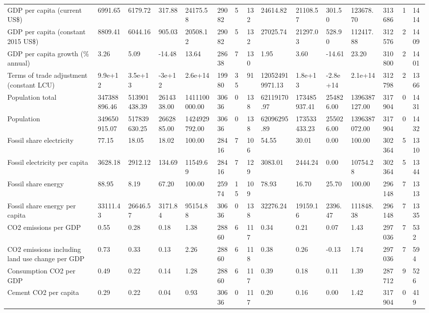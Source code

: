 \begin{longtable}{lllllllllllllll}
GDP per capita (current US\$) & 6991.65 & 6179.72 & 317.88 & 24175.58 & 29082 & 5 & 132 & 24614.82 & 21108.57 & 301.50 & 123678.70 & 313686 & 1 & 1414\\
GDP per capita (constant 2015 US\$) & 8809.41 & 6044.16 & 905.03 & 20508.12 & 29082 & 5 & 132 & 27025.74 & 21297.03 & 528.90 & 112417.88 & 312576 & 2 & 1409\\
GDP per capita growth (\% annual) & 3.26 & 5.09 & -14.48 & 13.64 & 28638 & 7 & 130 & 1.95 & 3.60 & -14.61 & 23.20 & 310800 & 2 & 1401\\
\addlinespace
Terms of trade adjustment (constant LCU) & 9.9e+12 & 3.5e+13 & -3e+12 & 2.6e+14 & 19980 & 35 & 91 & 120524919971.13 & 1.8e+13 & -2.8e+14 & 2.1e+14 & 312798 & 2 & 1366\\
Population total & 347388896.46 & 513901438.39 & 2614338.00 & 1411100000.00 & 30636 & 0 & 138 & 62119170.97 & 173485937.41 & 254826.00 & 1396387127.00 & 317904 & 0 & 1431\\
Population & 349650915.07 & 517839630.25 & 2662885.00 & 1424929792.00 & 30636 & 0 & 138 & 62096295.89 & 173533433.23 & 255026.00 & 1396387072.00 & 317904 & 0 & 1432\\
Fossil share electricity & 77.15 & 18.05 & 18.02 & 100.00 & 28416 & 7 & 106 & 54.55 & 30.01 & 0.00 & 100.00 & 302364 & 5 & 1310\\
Fossil electricity per capita & 3628.18 & 2912.12 & 134.69 & 11549.69 & 28416 & 7 & 129 & 3083.01 & 2444.24 & 0.00 & 10754.28 & 302364 & 5 & 1344\\
\addlinespace
Fossil share energy & 88.95 & 8.19 & 67.20 & 100.00 & 25974 & 15 & 109 & 78.93 & 16.70 & 25.70 & 100.00 & 296148 & 7 & 1313\\
Fossil share energy per capita & 33111.43 & 26646.57 & 3171.84 & 95154.88 & 30636 & 0 & 138 & 32276.24 & 19159.16 & 2396.47 & 111848.38 & 296148 & 7 & 1335\\
CO2 emissions per GDP & 0.55 & 0.28 & 0.18 & 1.38 & 28860 & 6 & 117 & 0.34 & 0.21 & 0.07 & 1.43 & 297036 & 7 & 532\\
CO2 emissions including land use change per GDP & 0.73 & 0.33 & 0.13 & 2.26 & 28860 & 6 & 118 & 0.38 & 0.26 & -0.13 & 1.74 & 297036 & 7 & 594\\
Consumption CO2 per GDP & 0.49 & 0.22 & 0.14 & 1.28 & 28860 & 6 & 117 & 0.39 & 0.18 & 0.11 & 1.39 & 287712 & 9 & 526\\
\addlinespace
Cement CO2 per capita & 0.29 & 0.22 & 0.04 & 0.93 & 30636 & 0 & 117 & 0.20 & 0.16 & 0.00 & 1.42 & 317904 & 0 & 419\\

\end{longtable}
